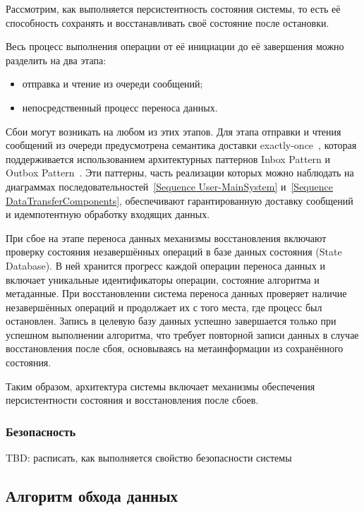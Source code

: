 Рассмотрим, как выполняется персистентность состояния системы, то есть её способность сохранять и восстанавливать своё состояние после остановки.

Весь процесс выполнения операции от её инициации до её завершения можно разделить на два этапа:
\begin{itemize}
  \item отправка и чтение из очереди сообщений;
  \item непосредственный процесс переноса данных.
\end{itemize}

Сбои могут возникать на любом из этих этапов. Для этапа отправки и чтения сообщений из очереди предусмотрена семантика доставки exactly-once~\cite{delivery-guarantees}, которая поддерживается использованием архитектурных паттернов Inbox Pattern и Outbox Pattern~\cite{outbox-and-inbox}. Эти паттерны, часть реализации которых можно наблюдать на диаграммах последовательностей~\ref{Sequence User-MainSystem} и~\ref{Sequence DataTransferComponents}, обеспечивают гарантированную доставку сообщений и идемпотентную обработку входящих данных.

При сбое на этапе переноса данных механизмы восстановления включают проверку состояния незавершённых операций в базе данных состояния (State Database). В ней хранится прогресс каждой операции переноса данных и включает уникальные идентификаторы операции, состояние алгоритма и метаданные. При восстановлении система переноса данных проверяет наличие незавершённых операций и продолжает их с того места, где процесс был остановлен. Запись в целевую базу данных успешно завершается только при успешном выполнении алгоритма, что требует повторной записи данных в случае восстановления после сбоя, основываясь на метаинформации из сохранённого состояния.

Таким образом, архитектура системы включает механизмы обеспечения персистентности состояния и восстановления после сбоев.

\subsubsection{Безопасность}

TBD: расписать, как выполняется свойство безопасности системы

\subsection{Алгоритм обхода данных}

